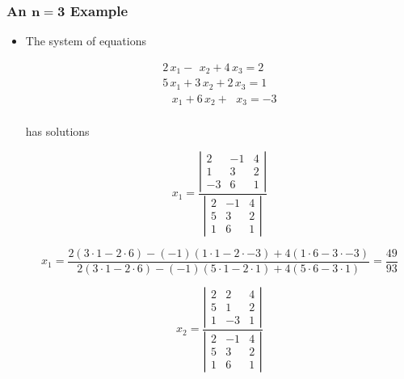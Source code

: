 \documentclass[12pt]{article}
\begin{document}
\subsubsection*{An $\mathbf{n=3}$ Example}
\begin{itemize}
\item The system of equations

\begin{equation}
\begin{array}{c}
2 \, x_1 - ~ \, x_2 + 4 \, x_3 = 2 \\
5 \, x_1 + 3 \, x_2 + 2 \, x_3 = 1 \\
~~~ \, x_1 + 6 \, x_2 + ~~ \, x_3 = -3 \\
\end{array}
\label{eq:3eq}
\end{equation}

\noindent
has solutions

\begin{equation}
\nonumber
x_1 = 
\frac{
\left|
\begin{array}{ccc}
 2 & -1 & 4 \\
 1 &  3 & 2 \\
-3 &  6 & 1
\end{array}
\right|
}{
\left|
\begin{array}{ccc}
 2 & -1 & 4 \\
 5 &  3 & 2 \\
 1 &  6 & 1
\end{array}
\right|
}
\end{equation}

\begin{equation}
x_1 = 
\frac{
    2 (3 \cdot 1 - 2 \cdot 6)
- (-1)(1 \cdot 1 - 2 \cdot -3)
+   4 (1 \cdot 6 - 3 \cdot -3)
}{
    2 (3 \cdot 1 - 2 \cdot 6)
- (-1)(5 \cdot 1 - 2 \cdot 1)
+   4 (5 \cdot 6 - 3 \cdot 1)
} = \frac{49}{93}
\end{equation}

\begin{equation}
x_2 =
\frac{
\left|
\begin{array}{ccc}
 2 &  2 & 4 \\
 5 &  1 & 2 \\
 1 & -3 & 1
\end{array}
\right|
}{
\left|
\begin{array}{ccc}
 2 & -1 & 4 \\
 5 &  3 & 2 \\
 1 &  6 & 1
\end{array}
\right|
}
\end{equation}


\end{itemize}
\end{document}
